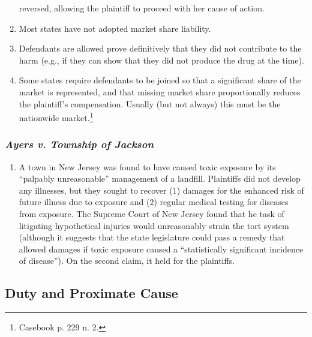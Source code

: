 \begin{enumerate}
    reversed, allowing the plaintiff to proceed with her cause of action.
    \item Most states have not adopted market share liability.
    \item Defendants are allowed prove definitively that they did not 
    contribute to the harm (e.g., if they can show that they did not produce 
    the drug at the time).
    \item Some states require defendants to be joined so that a significant 
    share of the market is represented, and that missing market share 
    proportionally reduces the plaintiff's compensation. Usually (but not 
    always) this must be the nationwide market.\footnote{Casebook p. 229 n. 
    2.}
\end{enumerate}

\subsubsection{\emph{Ayers v. Township of Jackson}}

\begin{enumerate}
    \item A town in New Jersey was found to have caused toxic exposure by its 
    ``palpably unreasonable'' management of a landfill. Plaintiffs did not 
    develop any illnesses, but they sought to recover (1) damages for the 
    enhanced risk of future illness due to exposure and (2) regular medical 
    testing for diseases from exposure. The Supreme Court of New Jersey found 
    that he task of litigating hypothetical injuries would unreasonably strain 
    the tort system (although it suggests that the state legislature could 
    pass a remedy that allowed damages if toxic exposure caused a 
    ``statistically significant incidence of disease''). On the second claim, 
    it held for the plaintiffs.
\end{enumerate}

\subsection{Duty and Proximate Cause}


